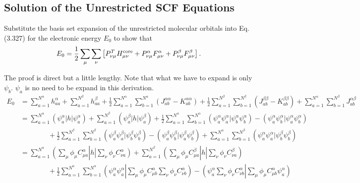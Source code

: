 \documentclass[a4paper]{book}
\newcounter{exercise}[chapter]
\newcounter{solution}[chapter]
\newcommand{\core}{{\rm core}}
\begin{document}
	\subsection{Solution of the Unrestricted SCF Equations}
	
	\begin{exercise}
	Substitute the basis set expansion of the unrestricted molecular orbitals into Eq.(3.327) for the electronic energy $E_0$ to show that
	\[
		E_0 = \frac{1}{2} \sum_\mu \sum_\nu \left[ P^T_{\nu\mu} H^{\core}_{\mu\nu} + P^\alpha_{\nu\mu} F^\alpha_{\mu\nu} + P^\beta_{\nu\mu} F^\beta_{\mu\nu} \right].
	\]
	\end{exercise}
	
	\begin{solution}
	
	The proof is direct but a little lengthy. Note that what we have to expand is only $\psi_b$. $\psi_a$ is no need to be expand in this derivation.
	\begin{align*}
		E_0 &= \sum_{ a=1 }^{ N^\alpha } h^\alpha_{aa} + \sum_{ a=1 }^{ N^\beta} h^\beta_{aa} + \frac{1}{2} \sum_{ a=1 }^{ N^\alpha } \sum_{ b=1 }^{ N^\alpha } ( J^{\alpha\alpha}_{ab} - K^{\alpha\alpha}_{ab} ) + \frac{1}{2} \sum_{ a=1 }^{ N^\beta } \sum_{ b=1 }^{ N^\beta } ( J^{\beta\beta}_{ab} - K^{\beta\beta}_{ab} ) + \sum_{ a=1 }^{ N^\alpha } \sum_{ b=1 }^{ N^\beta } J^{\alpha\beta}_{ab} \\
		&= \sum_{ a=1 }^{ N^\alpha } ( \psi^\alpha_a | h | \psi^\alpha_a ) + \sum_{ a=1 }^{ N^\beta} ( \psi^\beta_a | h | \psi^\beta_a ) + \frac{1}{2} \sum_{ a=1 }^{ N^\alpha } \sum_{ b=1 }^{ N^\alpha } ( \psi^\alpha_a \psi^\alpha_a | \psi^\alpha_b \psi^\alpha_b ) - ( \psi^\alpha_a \psi^\alpha_b | \psi^\alpha_a \psi^\alpha_b ) \\
		&\hspace{4em} + \frac{1}{2} \sum_{ a=1 }^{ N^\beta } \sum_{ b=1 }^{ N^\beta } ( \psi^\beta_a \psi^\beta_a | \psi^\beta_b \psi^\beta_b ) - ( \psi^\beta_a \psi^\beta_b | \psi^\beta_a \psi^\beta_b ) + \sum_{ a=1 }^{ N^\alpha } \sum_{ b=1 }^{ N^\beta } ( \psi^\alpha_a \psi^\alpha_a | \psi^\beta_b \psi^\beta_b ) \\
		&= \sum_{ a=1 }^{ N^\alpha } \left( \sum_\mu \phi_\mu C^\alpha_{\mu a} \right| h \left| \sum_\nu \phi_\nu C^\alpha_{\nu a} \right) + \sum_{ a=1 }^{ N^\beta} \left( \sum_\mu \phi_\mu C^\beta_{\mu a} \right| h \left| \sum_\nu \phi_\nu C^\beta_{\nu a} \right) \\
		&\hspace{4em} + \frac{1}{2} \sum_{ a=1 }^{ N^\alpha } \sum_{ b=1 }^{ N^\alpha } \left( \psi^\alpha_a \psi^\alpha_a \left| \right. \sum_\mu \phi_\mu C^\alpha_{\mu b} \sum_\nu \phi_\nu C^\alpha_{\nu b} \right) - \left( \psi^\alpha_a \sum_\nu \phi_\nu C^\alpha_{\nu b} \left| \right. \sum_\mu \phi_\mu C^\alpha_{\mu b} \psi^\alpha_a \right) \\

\end{align*}
\end{solution}
\end{document}
